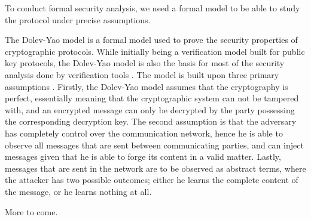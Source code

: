 To conduct formal security analysis, we need a formal model to be able to study the protocol under precise assumptions.

The Dolev-Yao model is a formal model used to prove the security properties of cryptographic protocols. While initially being a verification model built for public key protocols, the Dolev-Yao model is also the basis for most of the security analysis done by verification tools \cite{cremers2005operational}. The model is built upon three primary assumptions \cite{dolev1983security}. Firstly, the Dolev-Yao model assumes that the cryptography is perfect, essentially meaning that the cryptographic system can not be tampered with, and an encrypted message can only be decrypted by the party possessing the corresponding decryption key. The second assumption is that the adversary has completely control over the communication network, hence he is able to observe all messages that are sent between communicating parties, and can inject messages given that he is able to forge its content in a valid matter. Lastly, messages that are sent in the network are to be observed as abstract terms, where the attacker has two possible outcomes; either he learns the complete content of the message, or he learns nothing at all. 

More to come.


